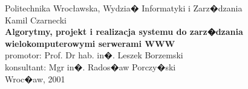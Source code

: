 \documentclass[a4paper,polish,titlepage,12pt]{report}
\begin{document}
\begin{titlepage}
\begin{center}
{\small\sc Politechnika Wrocławska, Wydzia� Informatyki i Zarz�dzania}\\
\vspace{2.5in}
{\Large Kamil Czarnecki}\\
\vspace{10mm}
{\Huge\bf Algorytmy, projekt i realizacja systemu do zarz�dzania wielokomputerowymi serwerami WWW}\\
\vspace{1in}
{\large promotor: Prof. Dr hab. in�. Leszek Borzemski}\\
{\large konsultant: Mgr in�. Rados�aw Porczy�ski}\\
\vspace{2in}
{\sf Wroc�aw, 2001}
\end{center}
\end{titlepage}



\tableofcontents

%
%
%
%










{\footnotesize\listoffigures}
\end{document}
